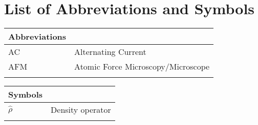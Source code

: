 %

\chapter[List of Abbreviations and Symbols]{List of Abbreviations and Symbols}


\begin{center}
	\small
	\begin{longtable}{ll}
	\toprule
	Abbreviations & {} \\
	\bottomrule
	AC				& Alternating Current \\
	AFM				& Atomic Force Microscopy/Microscope \\
	\etc{}		&	\etc{} \\
	\hline
	\end{longtable}
\end{center}

\begin{center}
	\small
	\begin{longtable}{ll}
	\toprule
	Symbols & {} \\
	\bottomrule
	$\hat{\rho}$		& Density operator \\
	\etc{}					& \etc{} \\
	\hline
	\end{longtable}
\end{center}

